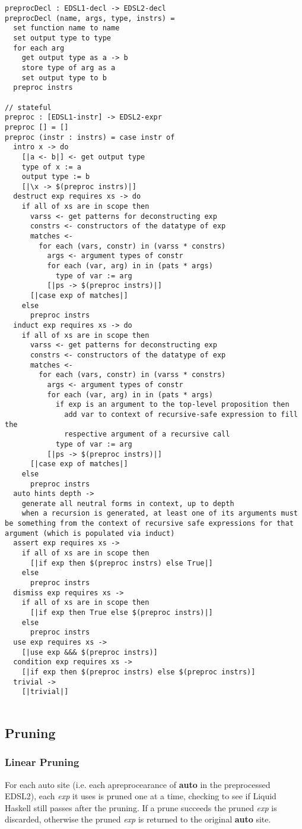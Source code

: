 \begin{verbatim}
preprocDecl : EDSL1-decl -> EDSL2-decl
preprocDecl (name, args, type, instrs) =
  set function name to name
  set output type to type
  for each arg
    get output type as a -> b 
    store type of arg as a
    set output type to b
  preproc instrs

// stateful
preproc : [EDSL1-instr] -> EDSL2-expr
preproc [] = []
preproc (instr : instrs) = case instr of 
  intro x -> do
    [|a <- b|] <- get output type
    type of x := a
    output type := b
    [|\x -> $(preproc instrs)|]
  destruct exp requires xs -> do
    if all of xs are in scope then 
      varss <- get patterns for deconstructing exp
      constrs <- constructors of the datatype of exp
      matches <- 
        for each (vars, constr) in (varss * constrs)
          args <- argument types of constr
          for each (var, arg) in in (pats * args)
            type of var := arg
          [|ps -> $(preproc instrs)|]
      [|case exp of matches|]
    else
      preproc instrs
  induct exp requires xs -> do
    if all of xs are in scope then 
      varss <- get patterns for deconstructing exp
      constrs <- constructors of the datatype of exp
      matches <-
        for each (vars, constr) in (varss * constrs)
          args <- argument types of constr
          for each (var, arg) in in (pats * args)
            if exp is an argument to the top-level proposition then
              add var to context of recursive-safe expression to fill the
              respective argument of a recursive call
            type of var := arg
          [|ps -> $(preproc instrs)|]
      [|case exp of matches|]
    else
      preproc instrs
  auto hints depth ->
    generate all neutral forms in context, up to depth
    when a recursion is generated, at least one of its arguments must be something from the context of recursive safe expressions for that argument (which is populated via induct)
  assert exp requires xs ->
    if all of xs are in scope then
      [|if exp then $(preproc instrs) else True|]
    else
      preproc instrs
  dismiss exp requires xs ->
    if all of xs are in scope then
      [|if exp then True else $(preproc instrs)|]
    else
      preproc instrs
  use exp requires xs -> 
    [|use exp &&& $(preproc instrs)]
  condition exp requires xs ->
    [|if exp then $(preproc instrs) else $(preproc instrs)]
  trivial ->
    [|trivial|]


\end{verbatim}

\subsection{Pruning}

\subsubsection{Linear Pruning}

For each auto site (i.e. each apreprocearance of \textbf{auto} in the preprocessed EDSL2), each \textit{exp} it uses is pruned one at a time, checking to see if Liquid Haskell still passes after the pruning. If a prune succeeds the pruned \textit{exp} is discarded, otherwise the pruned \textit{exp} is returned to the original \textbf{auto} site.